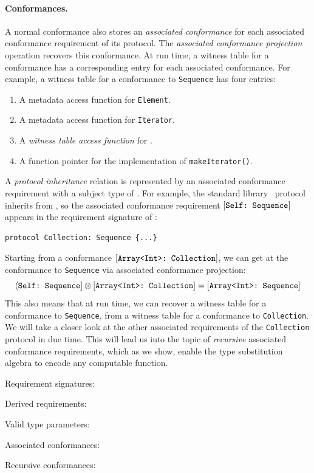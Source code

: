 \documentclass[../generics]{subfiles}
\begin{document}
\paragraph{Conformances.}
A normal conformance also stores an \emph{associated conformance} for each associated conformance requirement of its protocol. The \emph{associated conformance projection} operation recovers this conformance. At run time, a witness table for a conformance has a corresponding entry for each associated conformance. For example, a witness table for a conformance to \texttt{Sequence} has four entries:
\begin{enumerate}
\item A metadata access function for \texttt{Element}.
\item A metadata access function for \texttt{Iterator}.
\item A \emph{witness table access function} for .
\item A function pointer for the implementation of \texttt{makeIterator()}.
\end{enumerate}
A \emph{protocol inheritance} relation is represented by an associated conformance requirement with a subject type of \tSelf. For example, the standard library \tCollection\ protocol inherits from \tSequence, so the associated conformance requirement $[\texttt{Self:~Sequence}]$ appears in the requirement signature of \tCollection:
\begin{Verbatim}
protocol Collection: Sequence {...}
\end{Verbatim}
Starting from a conformance $[\texttt{Array<Int>:~Collection}]$, we can get at the conformance to \texttt{Sequence} via associated conformance projection:
\[\langle\texttt{Self:~Sequence}]\otimes[\texttt{Array<Int>:~Collection}]=[\texttt{Array<Int>:~Sequence}]\]
This also means that at run time, we can recover a witness table for a conformance to \texttt{Sequence}, from a witness table for a conformance to \texttt{Collection}. We will take a closer look at the other associated requirements of the \texttt{Collection} protocol in due time. This will lead us into the topic of \emph{recursive} associated conformance requirements, which as we show, enable the type substitution algebra to encode any computable function.

\begin{MoreDetails}
\item Requirement signatures: 
\item Derived requirements: 
\item Valid type parameters: 
\item Associated conformances: 
\item Recursive conformances: 
\end{MoreDetails}
\end{document}
